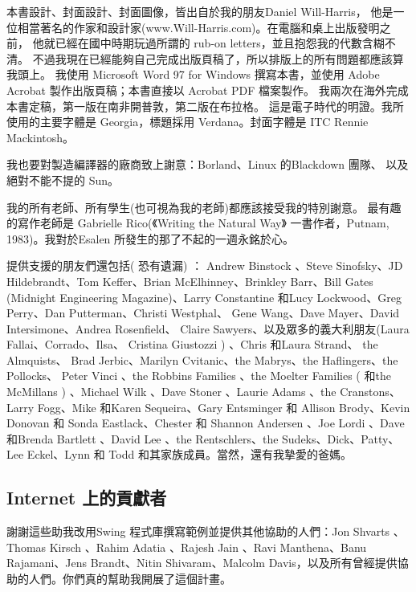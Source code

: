 本書設計、封面設計、封面圖像，皆出自於我的朋友Daniel Will-Harris，
他是一位相當著名的作家和設計家(www.Will-Harris.com)。在電腦和桌上出版發明之前，
他就已經在國中時期玩過所謂的 rub-on letters，並且抱怨我的代數含糊不清。
不過我現在已經能夠自己完成出版頁稿了，所以排版上的所有問題都應該算我頭上。
我使用 Microsoft Word 97 for Windows 撰寫本書，並使用
Adobe Acrobat 製作出版頁稿；本書直接以 Acrobat PDF 檔案製作。
我兩次在海外完成本書定稿，第一版在南非開普敦，第二版在布拉格。
這是電子時代的明證。我所使用的主要字體是 Georgia，標題採用 Verdana。封面字體是
ITC Rennie Mackintosh。

我也要對製造編譯器的廠商致上謝意：Borland、Linux 的Blackdown 團隊、
以及絕對不能不提的 Sun。

我的所有老師、所有學生(也可視為我的老師)都應該接受我的特別謝意。
最有趣的寫作老師是 Gabrielle Rico(《Writing the Natural Way》
一書作者，Putnam, 1983)。我對於Esalen 所發生的那了不起的一週永銘於心。

提供支援的朋友們還包括( 恐有遺漏) ： Andrew Binstock 、Steve
Sinofsky、JD Hildebrandt、Tom Keffer、Brian McElhinney、Brinkley
Barr、Bill Gates (Midnight Engineering Magazine)、Larry Constantine
和Lucy Lockwood、Greg Perry、Dan Putterman、Christi Westphal、
Gene Wang、Dave Mayer、David Intersimone、Andrea Rosenfield、
Claire Sawyers、以及眾多的義大利朋友(Laura Fallai、Corrado、Ilsa、
Cristina Giustozzi ) 、Chris 和Laura Strand、 the Almquists、 Brad
Jerbic、Marilyn Cvitanic、the Mabrys、the Haflingers、the Pollocks、
Peter Vinci 、the Robbins Families 、the Moelter Families ( 和the
McMillans ) 、Michael Wilk 、Dave Stoner 、Laurie Adams 、the
Cranstons、Larry Fogg、Mike 和Karen Sequeira、Gary Entsminger 和
Allison Brody、Kevin Donovan 和
Sonda Eastlack、Chester 和 Shannon
Andersen 、Joe Lordi 、Dave 和Brenda Bartlett 、David Lee 、the
Rentschlers、the Sudeks、Dick、Patty、Lee Eckel、Lynn 和
Todd 和其家族成員。當然，還有我摯愛的爸媽。

\subsection{Internet 上的貢獻者}
謝謝這些助我改用Swing 程式庫撰寫範例並提供其他協助的人們：Jon
Shvarts 、Thomas Kirsch 、Rahim Adatia 、Rajesh Jain 、Ravi
Manthena、Banu Rajamani、Jens Brandt、Nitin Shivaram、Malcolm
Davis，以及所有曾經提供協助的人們。你們真的幫助我開展了這個計畫。
